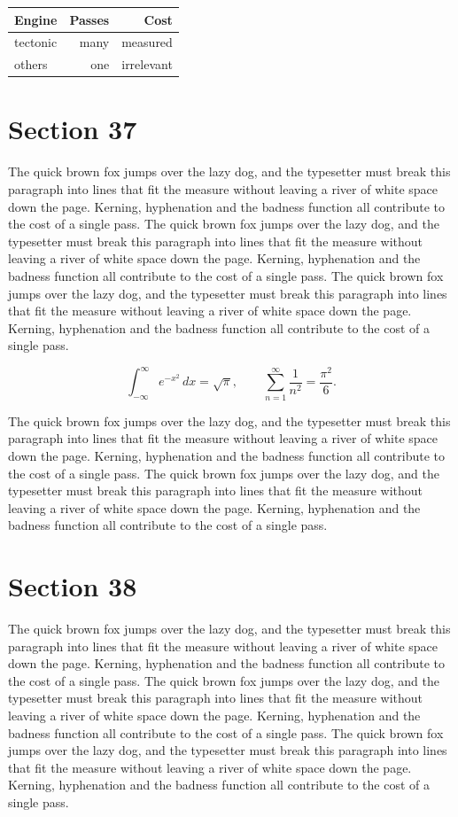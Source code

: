 \documentclass{article}
\begin{document}
\begin{center}
\begin{tabular}{lrr}
\toprule
Engine & Passes & Cost \\
\midrule
tectonic & many & measured \\
others & one & irrelevant \\
\bottomrule
\end{tabular}
\end{center}

\section{Section 37}
The quick brown fox jumps over the lazy dog, and the typesetter must break this paragraph into lines that fit the measure without leaving a river of white space down the page. Kerning, hyphenation and the badness function all contribute to the cost of a single pass. The quick brown fox jumps over the lazy dog, and the typesetter must break this paragraph into lines that fit the measure without leaving a river of white space down the page. Kerning, hyphenation and the badness function all contribute to the cost of a single pass. The quick brown fox jumps over the lazy dog, and the typesetter must break this paragraph into lines that fit the measure without leaving a river of white space down the page. Kerning, hyphenation and the badness function all contribute to the cost of a single pass. 

\begin{equation}
\int_{-\infty}^{\infty} e^{-x^{2}}\,dx = \sqrt{\pi}, \qquad
\sum_{n=1}^{\infty} \frac{1}{n^{2}} = \frac{\pi^{2}}{6}.
\end{equation}

The quick brown fox jumps over the lazy dog, and the typesetter must break this paragraph into lines that fit the measure without leaving a river of white space down the page. Kerning, hyphenation and the badness function all contribute to the cost of a single pass. The quick brown fox jumps over the lazy dog, and the typesetter must break this paragraph into lines that fit the measure without leaving a river of white space down the page. Kerning, hyphenation and the badness function all contribute to the cost of a single pass. 
\section{Section 38}
The quick brown fox jumps over the lazy dog, and the typesetter must break this paragraph into lines that fit the measure without leaving a river of white space down the page. Kerning, hyphenation and the badness function all contribute to the cost of a single pass. The quick brown fox jumps over the lazy dog, and the typesetter must break this paragraph into lines that fit the measure without leaving a river of white space down the page. Kerning, hyphenation and the badness function all contribute to the cost of a single pass. The quick brown fox jumps over the lazy dog, and the typesetter must break this paragraph into lines that fit the measure without leaving a river of white space down the page. Kerning, hyphenation and the badness function all contribute to the cost of a single pass. 
\end{document}
